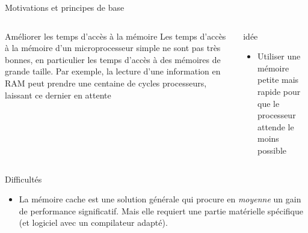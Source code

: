 
% 
\begin{Frame}{Motivations et principes de base}
  \begin{columns}[t]
    \begin{column}{\BW} %
      \begin{block}{ Améliorer les temps d'accès à la mémoire}
        Les temps d'accès à la mémoire d'un microprocesseur
        simple ne sont pas très bonnes, en particulier les temps
        d'accès à des mémoires de grande taille. Par exemple, la
        lecture d'une information en RAM peut prendre une centaine de
        cycles processeurs, laissant ce dernier en attente
      \end{block} 
    \end{column}
    
    \begin{column}{\BW} %
      \begin{block}{idée}
\begin{itemize}
        \item Utiliser une mémoire petite mais rapide pour que le processeur attende le moins possible
        \end{itemize}
      \end{block}   
    \end{column}
  \end{columns}  

\begin{block}{Difficultés}
       \begin{center}
 	\begin{itemize}
         \item La mémoire cache est une solution générale qui procure en \emph{moyenne} un gain de performance significatif. Mais elle requiert une partie matérielle spécifique (et logiciel avec un compilateur adapté). 
        \end{itemize}
       \end{center}
      \end{block}   

\end{Frame}


